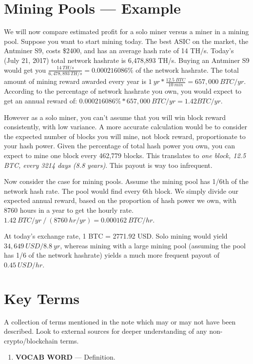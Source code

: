 \documentclass[full.tex]{subfiles}
\begin{document}
    \section*{Mining Pools --- Example}
    
    We will now compare estimated profit for a solo miner versus a miner in a mining pool. Suppose you want to start mining today. The best ASIC on the market, the Antminer S9, costs \$2400, and has an average hash rate of 14 TH/s. Today's (July 21, 2017) total network hashrate is 6,478,893 TH/s. Buying an Antminer S9 would get you $\frac{14~TH/s}{6,478,893~TH/s} = 0.000216086\%$ of the network hashrate. The total amount of mining reward awarded every year is $1~yr * \frac{12.5~BTC}{10~min} = 657,000~BTC/yr$. According to the percentage of network hashrate you own, you would expect to get an annual reward of: $0.000216086\% * 657,000~BTC/yr = 1.42 BTC/yr$. 
    
    However as a solo miner, you can't assume that you will win block reward consistently, with low variance. A more accurate calculation would be to consider the expected number of blocks you will mine, not block reward, proportionate to your hash power. Given the percentage of total hash power you own, you can expect to mine one block every 462,779 blocks. This translates to \textit{one block, 12.5 BTC, every 3214 days (8.8 years)}. This payout is way too infrequent.
    
    Now consider the case for mining pools. Assume the mining pool has 1/6th of the network hash rate. The pool would find every 6th block. We simply divide our expected annual reward, based on the proportion of hash power we own, with 8760 hours in a year to get the hourly rate. $1.42~BTC/yr~/~(8760~hr/yr) = 0.000162~BTC/hr$. 
    
    At today's exchange rate, 1 BTC = 2771.92 USD. Solo mining would yield $34,649~USD/8.8~yr$, whereas mining with a large mining pool (assuming the pool has 1/6 of the network hashrate) yields a much more frequent payout of $0.45~USD/hr$.
    
    \newpage
    \thispagestyle{firstpage}
    \vspace*{2\baselineskip}
    \section*{Key Terms}
    \noindent A collection of terms mentioned in the note which may or may not have been described. Look to external sources for deeper understanding of any non-crypto/blockchain terms.
    \begin{enumerate}
        \item \textbf{VOCAB WORD} --- Definition. %
    \end{enumerate}
\end{document}

